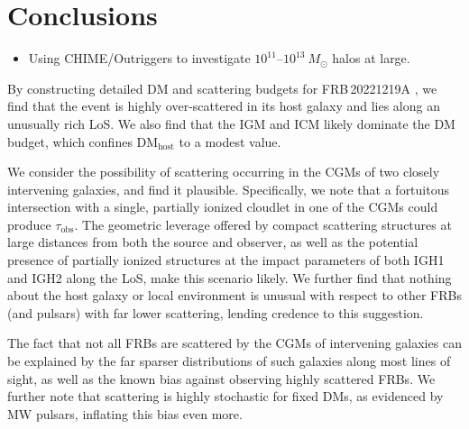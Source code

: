 \documentclass[twocolumn, linenumbers, tra]{aastex631}
\newcommand{\nihari}{FRB\,20221219A } %
\begin{document}
\section{Conclusions} \label{sec:conclusions}

\begin{itemize}
  \item Using CHIME/Outriggers to investigate $10^{11}$--$10^{13}\ M_\odot$ halos at large.
\end{itemize}

By constructing detailed DM and scattering budgets for \nihari, we find that the event is highly over-scattered in its host galaxy and lies along an unusually rich LoS. We also find that the IGM and ICM likely dominate the DM budget, which confines DM$_{\mathrm{host}}$ to a modest value.

We consider the possibility of scattering occurring in the CGMs of two closely intervening galaxies, and find it plausible. Specifically, we note that a fortuitous intersection with a single, partially ionized cloudlet in one of the CGMs could produce $\tau_{\mathrm{obs}}$. The geometric leverage offered by compact scattering structures at large distances from both the source and observer, as well as the potential presence of partially ionized structures at the impact parameters of both IGH1 and IGH2 along the LoS, make this scenario likely. We further find that nothing about the host galaxy or local environment is unusual with respect to other FRBs (and pulsars) with far lower scattering, lending credence to this suggestion.

The fact that {not all FRBs} are scattered by the CGMs of intervening galaxies can be explained by the far sparser distributions of such galaxies along most lines of sight, as well as the known bias against observing highly scattered FRBs. We further note that scattering is highly stochastic for fixed DMs, as evidenced by MW pulsars, inflating this bias even more.

\end{document}

